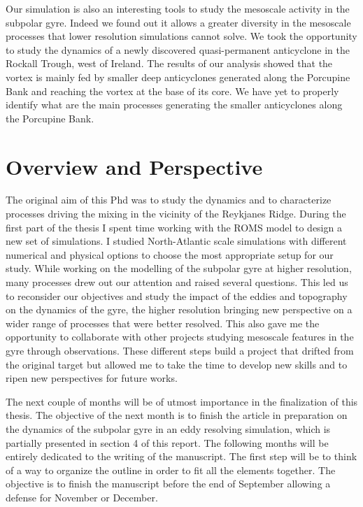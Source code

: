 \documentclass[11pt,a4paper]{article}
\begin{document}
Our simulation is also an interesting tools to study the mesoscale activity in the subpolar gyre. Indeed we found out it allows a greater diversity in the mesoscale processes that lower resolution simulations cannot solve. We took the opportunity to study the dynamics of a newly discovered quasi-permanent anticyclone in the Rockall Trough, west of Ireland. The results of our analysis showed that the vortex is mainly fed by smaller deep anticyclones generated along the Porcupine Bank and reaching the vortex at the base of its core. We have yet to properly identify what are the main processes generating the smaller anticyclones along the Porcupine Bank.


\section{Overview and Perspective}

The original aim of this Phd was to study the dynamics and to characterize processes driving the mixing in the vicinity of the Reykjanes Ridge. During the first part of the thesis I spent time working with the ROMS model to design a new set of simulations. I studied North-Atlantic scale simulations with different numerical and physical options to choose the most appropriate setup for our study. While working on the modelling of the subpolar gyre at higher resolution, many processes drew out our attention and raised several questions. This led us to reconsider our objectives and study the impact of the eddies and topography on the dynamics of the gyre, the higher resolution bringing new perspective on a wider range of processes that were better resolved. This also gave me the opportunity to collaborate with other projects studying mesoscale features in the gyre through observations. These different steps build a project that drifted from the original target but allowed me to take the time to develop new skills and to ripen new perspectives for future works.

The next couple of months will be of utmost importance in the finalization of this thesis. The objective of the next month is to finish the article in preparation on the dynamics of the subpolar gyre in an eddy resolving simulation, which is partially presented in section 4 of this report. The following months will be entirely dedicated to the writing of the manuscript. The first step will be to think of a way to organize the outline in order to fit all the elements together. The objective is to finish the manuscript before the end of September allowing a defense for November or December.


\newpage


\end{document}
